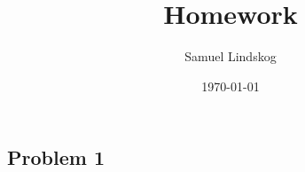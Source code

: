 \documentclass{article}
\title{Homework}
\author{Samuel Lindskog}
\date\today
\begin{document}
\maketitle
\subsection*{Problem 1}
\end{document}
